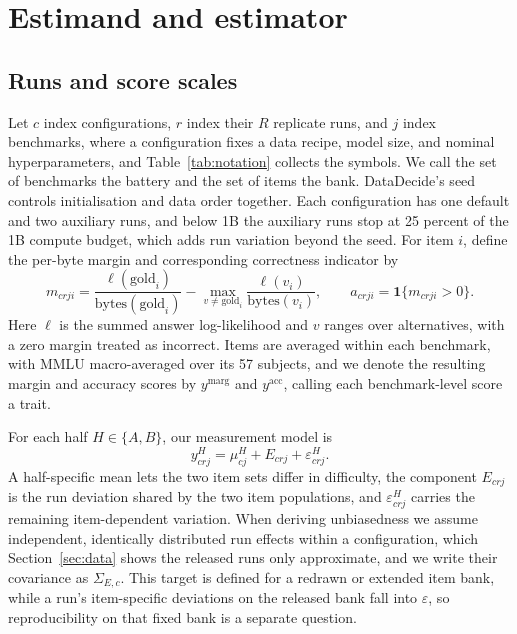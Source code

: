 \section{Estimand and estimator}
\label{sec:estimator}
\subsection{Runs and score scales}
Let $c$ index configurations, $r$ index their $R$ replicate runs, and $j$ index benchmarks, where a configuration fixes a data recipe, model size, and nominal hyperparameters, and Table~\ref{tab:notation} collects the symbols. We call the set of benchmarks the battery and the set of items the bank. DataDecide's seed controls initialisation and data order together. Each configuration has one default and two auxiliary runs, and below 1B the auxiliary runs stop at 25 percent of the 1B compute budget, which adds run variation beyond the seed. For item $i$, define the per-byte margin and corresponding correctness indicator by
\begin{equation}
m_{crji}=\frac{\ell(\mathrm{gold}_i)}{\mathrm{bytes}(\mathrm{gold}_i)}-
\max_{v\ne\mathrm{gold}_i}\frac{\ell(v_i)}{\mathrm{bytes}(v_i)},
\qquad a_{crji}=\mathbf{1}\{m_{crji}>0\}.
\label{eq:scores}
\end{equation}
Here $\ell$ is the summed answer log-likelihood and $v$ ranges over alternatives, with a zero margin treated as incorrect. Items are averaged within each benchmark, with MMLU macro-averaged over its 57 subjects, and we denote the resulting margin and accuracy scores by $y^{\mathrm{marg}}$ and $y^{\mathrm{acc}}$, calling each benchmark-level score a trait.

For each half $H\in\{A,B\}$, our measurement model is
\begin{equation}
y^H_{crj}=\mu^H_{cj}+E_{crj}+\varepsilon^H_{crj}.
\label{eq:model}
\end{equation}
A half-specific mean lets the two item sets differ in difficulty, the component $E_{crj}$ is the run deviation shared by the two item populations, and $\varepsilon^H_{crj}$ carries the remaining item-dependent variation. When deriving unbiasedness we assume independent, identically distributed run effects within a configuration, which Section~\ref{sec:data} shows the released runs only approximate, and we write their covariance as $\Sigma_{E,c}$. This target is defined for a redrawn or extended item bank, while a run's item-specific deviations on the released bank fall into $\varepsilon$, so reproducibility on that fixed bank is a separate question.

